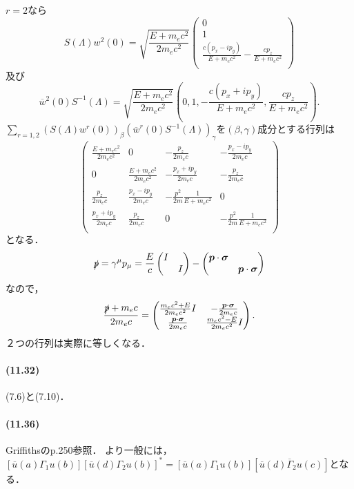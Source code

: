 $r=2$なら
\[S(\Lambda)w^2(0)=\sqrt{\frac{E + m_ec^2}{2m_ec^2}}
\begin{pmatrix}
  0\\
  1\\
  \frac{c(p_x - ip_y)}{E + m_ec^2}
   - \frac{cp_z}{E + m_ec^2}\\
\end{pmatrix}
\]
及び
\[\overline{w}^2(0)S^{ - 1}(\Lambda)=\sqrt{\frac{E + m_ec^2}{2m_ec^2}}\left(0,1, - \frac{c(p_x + ip_y)}{E + m_ec^2},\frac{cp_z}{E + m_ec^2}\right). \]
$\sum_{r=1,2}(S(\Lambda)w^r(0))_\beta(\overline{w}^r(0)S^{ - 1}(\Lambda))_\gamma$を$(\beta,\gamma)$成分とする行列は
\[
\begin{pmatrix}
  \frac{E + m_ec^2}{2m_ec^2} & 0 &  - \frac{p_z}{2m_ec} &  - \frac{p_x - ip_y}{2m_ec}\\
  0 & \frac{E + m_ec^2}{2m_ec^2} &  - \frac{p_x + ip_y}{2m_ec} &  - \frac{p_z}{2m_ec}\\
  \frac{p_z}{2m_ec} & \frac{p_x - ip_y}{2m_ec} &  - \frac{p^2}{2m}\frac{1}{E + m_ec^2} & 0\\
  \frac{p_x + ip_y}{2m_ec} & \frac{p_z}{2m_ec} & 0 &  - \frac{p^2}{2m}\frac{1}{E + m_ec^2}\\
\end{pmatrix}
\]
となる．
\[\slashed{p} =\gamma^\mu p_\mu=\frac{E}{c}
\begin{pmatrix}
I & \\
& I
\end{pmatrix}
 -
\begin{pmatrix}
  \boldsymbol{p}\cdot\boldsymbol\sigma & \\
  & \boldsymbol{p}\cdot\boldsymbol\sigma
\end{pmatrix}
\]
なので，
\[\frac{\slashed{p}  + m_ec}{2m_ec}=
\begin{pmatrix}
  \frac{m_ec^2 + E}{2m_ec^2}I &  - \frac{\boldsymbol{p}\cdot\boldsymbol\sigma}{2m_ec}\\
  \frac{\boldsymbol{p}\cdot\boldsymbol\sigma}{2m_ec} & \frac{m_ec^2 - E}{2m_ec^2}I
\end{pmatrix}
.\]
２つの行列は実際に等しくなる．

\paragraph{(11.32)}
(7.6)と(7.10)．

\paragraph{(11.36)}
Griffithsのp.250参照．
より一般には，$[\overline{u}(a)\Gamma_1 u(b)][\overline{u}(d)\Gamma_2 u(b)]^*=[\overline{u}(a)\Gamma_1 u(b)][\overline{u}(d)\overline{\Gamma}_2 u(c)]$となる．
